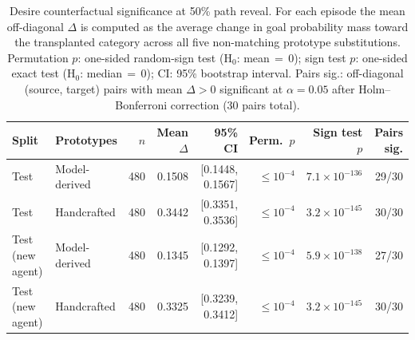 \begin{table}[t]
  \centering
  \scriptsize
  \setlength{\tabcolsep}{3pt}
  \caption{Desire counterfactual significance at 50\% path reveal. For each episode the mean off-diagonal $\Delta$ is computed as the average change in goal probability mass toward the transplanted category across all five non-matching prototype substitutions. Permutation $p$: one-sided random-sign test (H$_0$: mean\,$=$\,0); sign test $p$: one-sided exact test (H$_0$: median\,$=$\,0); CI: 95\% bootstrap interval. Pairs sig.: off-diagonal (source, target) pairs with mean $\Delta>0$ significant at $\alpha=0.05$ after Holm--Bonferroni correction (30 pairs total).}
  \label{tab:cf_desire_significance}
  \begin{tabular}{llrrrrrr}
    \toprule
    Split & Prototypes & $n$ & Mean $\Delta$ & 95\% CI & Perm.\ $p$ & Sign test $p$ & Pairs sig. \\
    \midrule
    Test             & Model-derived & 480 & 0.1508 & [0.1448, 0.1567] & ${\le}10^{-4}$ & $7.1\times10^{-136}$ & 29/30 \\
    Test             & Handcrafted   & 480 & 0.3442 & [0.3351, 0.3536] & ${\le}10^{-4}$ & $3.2\times10^{-145}$ & 30/30 \\
    Test (new agent) & Model-derived & 480 & 0.1345 & [0.1292, 0.1397] & ${\le}10^{-4}$ & $5.9\times10^{-138}$ & 27/30 \\
    Test (new agent) & Handcrafted   & 480 & 0.3325 & [0.3239, 0.3412] & ${\le}10^{-4}$ & $3.2\times10^{-145}$ & 30/30 \\
    \bottomrule
  \end{tabular}
\end{table}

